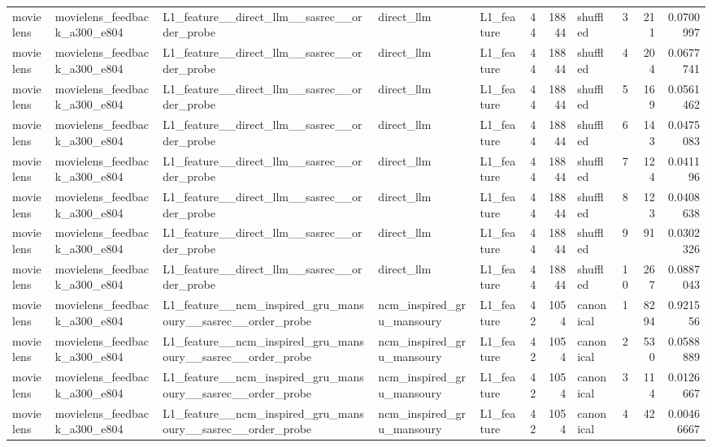 \begin{table}[htbp!]
\begin{tabular}{lllllrrlrrr}
movielens & movielens\_feedback\_a300\_e804 & L1\_feature\_\_direct\_llm\_\_sasrec\_\_order\_probe & direct\_llm & L1\_feature & 44 & 18844 & shuffled & 3 & 211 & 0.0700997 \\
movielens & movielens\_feedback\_a300\_e804 & L1\_feature\_\_direct\_llm\_\_sasrec\_\_order\_probe & direct\_llm & L1\_feature & 44 & 18844 & shuffled & 4 & 204 & 0.0677741 \\
movielens & movielens\_feedback\_a300\_e804 & L1\_feature\_\_direct\_llm\_\_sasrec\_\_order\_probe & direct\_llm & L1\_feature & 44 & 18844 & shuffled & 5 & 169 & 0.0561462 \\
movielens & movielens\_feedback\_a300\_e804 & L1\_feature\_\_direct\_llm\_\_sasrec\_\_order\_probe & direct\_llm & L1\_feature & 44 & 18844 & shuffled & 6 & 143 & 0.0475083 \\
movielens & movielens\_feedback\_a300\_e804 & L1\_feature\_\_direct\_llm\_\_sasrec\_\_order\_probe & direct\_llm & L1\_feature & 44 & 18844 & shuffled & 7 & 124 & 0.041196 \\
movielens & movielens\_feedback\_a300\_e804 & L1\_feature\_\_direct\_llm\_\_sasrec\_\_order\_probe & direct\_llm & L1\_feature & 44 & 18844 & shuffled & 8 & 123 & 0.0408638 \\
movielens & movielens\_feedback\_a300\_e804 & L1\_feature\_\_direct\_llm\_\_sasrec\_\_order\_probe & direct\_llm & L1\_feature & 44 & 18844 & shuffled & 9 & 91 & 0.0302326 \\
movielens & movielens\_feedback\_a300\_e804 & L1\_feature\_\_direct\_llm\_\_sasrec\_\_order\_probe & direct\_llm & L1\_feature & 44 & 18844 & shuffled & 10 & 267 & 0.0887043 \\
movielens & movielens\_feedback\_a300\_e804 & L1\_feature\_\_ncm\_inspired\_gru\_mansoury\_\_sasrec\_\_order\_probe & ncm\_inspired\_gru\_mansoury & L1\_feature & 42 & 1054 & canonical & 1 & 8294 & 0.921556 \\
movielens & movielens\_feedback\_a300\_e804 & L1\_feature\_\_ncm\_inspired\_gru\_mansoury\_\_sasrec\_\_order\_probe & ncm\_inspired\_gru\_mansoury & L1\_feature & 42 & 1054 & canonical & 2 & 530 & 0.0588889 \\
movielens & movielens\_feedback\_a300\_e804 & L1\_feature\_\_ncm\_inspired\_gru\_mansoury\_\_sasrec\_\_order\_probe & ncm\_inspired\_gru\_mansoury & L1\_feature & 42 & 1054 & canonical & 3 & 114 & 0.0126667 \\
movielens & movielens\_feedback\_a300\_e804 & L1\_feature\_\_ncm\_inspired\_gru\_mansoury\_\_sasrec\_\_order\_probe & ncm\_inspired\_gru\_mansoury & L1\_feature & 42 & 1054 & canonical & 4 & 42 & 0.00466667 \\

\end{tabular}
\end{table}
